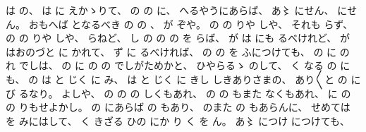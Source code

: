 %
は
の、
%
は
に
えかゝりて、
%
の
の
に、
%
へるやうにあらば、
%
あ〻
にせん、
%
にせん。
%
おもへば
となるべき
の
の
、
%
が
ぞや。
%
の
の
りや
しや、
%
それも
らず、
%
の
の
りや
しや、
%
らねど、
%
し
の
の
の
を
らば、
%
が
は
にも
るべけれど、
%
が
はおのづと
に
かれて、
%
ず
に
るべければ、
%
の
の
を
ふにつけても、
%
の
に
の
れ
でしは、
%
の
に
の
の
でしがためかと、
%
ひやらるゝ
のして、
%
く
なる
の
にも、
%
の
は
と
じく
に
み、
%
は
と
じく
に
きし
しきありさまの、
%
あり〳〵と
の
に
び
るなり。
%
よしや、
%
の
の
の
しくもあれ、
%
の
の
もまた
なくもあれ、
%
に
の
の
りもせよかし。
%
の
にあらば
の
もあり、
%
のまた
の
もあらんに、
%
せめては
を
みにはして、
%
く
きざる
ひの
にか
り
く
を
ん。
%
あ〻
につけ
につけても、
